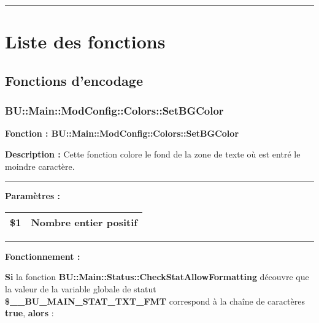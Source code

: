 \documentclass[a4paper,10pt]{article}
\begin{document}


\color{sec1}\par\noindent\rule{\textwidth}{0.4pt}\color{text}

\color{sec1}
\section{Liste des fonctions}\color{text}

\color{sec2}
\subsection{Fonctions d'encodage}\color{text}

\color{sec3}
\subsubsection{BU::Main::ModConfig::Colors::SetBGColor}\color{text}

\begin{justify}
    \textbf{Fonction : \color{func}BU::Main::ModConfig::Colors::SetBGColor}
\end{justify}

\setlength{\parskip}{1em}

\begin{justify}
    \textbf{Description :} Cette fonction colore le fond de la zone de texte où est entré le moindre caractère.
\end{justify}


\par\noindent\rule{\textwidth}{0.4pt}

\begin{justify}
    \textbf{Paramètres :}

    \begin{tabular}{|l|l|}
        \hline
        \textbf{\color{orange}\$1} & Nombre entier positif\\
        \hline
    \end{tabular}
\end{justify}


\par\noindent\rule{\textwidth}{0.4pt}

\begin{justify}
    \textbf{Fonctionnement :}

    \textbf{\color{cond}Si} la fonction \textbf{\color{func}BU::Main::Status::CheckStatAllowFormatting} découvre que la valeur de la variable globale de statut \textbf{\color{vars}\$\_\_BU\_MAIN\_STAT\_TXT\_FMT} correspond à la chaîne de caractères \textbf{true}, \textbf{\color{cond}alors} :
\end{justify}
\end{document}
